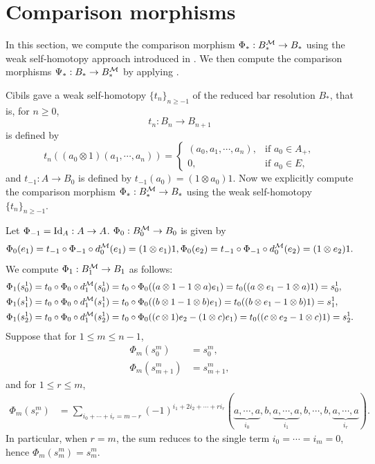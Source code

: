 \documentclass[10pt, reqno]{amsart}
\theoremstyle{definition}
\theoremstyle{remark}
\numberwithin{equation}{section}
\begin{document}
\section{Comparison morphisms}\label{sec: Comparison morphisms}
 In this section, we compute the comparison morphism $\Phi_*:B_*^{\mathcal{M}} \to B_*$ using  the weak self-homotopy approach introduced in \cite{IIVZ15}. We then compute the comparison morphisms $\Psi_*:B_* \to B_*^{\mathcal{M}}$ by applying \cite[Theorem 3.3]{CLZ24}.

Cibils\cite{Cib90} gave a weak self-homotopy \(\{t_n\}_{n\ge -1}\) of the reduced bar resolution \(B_*\), that is, for $n\geq0$,
\[t_n:B_n\to B_{n+1}\]
is defined by
\[
t_n((a_0\otimes 1)(a_1, \cdots, a_n)) =
\begin{cases}
    (a_0, a_1, \cdots , a_n), & \text{if } a_0 \in A_+, \\
    0, & \text{if } a_0 \in E,
\end{cases}
\]
and \(t_{-1}: A \to B_0\) is defined by $t_{-1}(a_0) =(1\otimes a_0)1$. Now we explicitly compute the comparison morphism \(\Phi_*:B_*^{\mathcal{M}} \to B_*\) using the weak self-homotopy \(\{t_n\}_{n\ge -1}\).

Let $\Phi_{-1}=\mathrm{Id}_A:A\rightarrow{A}$. $\Phi_0:B_0^{\mathcal{M}}\to B_0$ is given by
\[\Phi_0(e_1)=t_{-1}\circ\Phi_{-1}\circ d_0^{\mathcal{M}}(e_1)=(1 \otimes e_1)1, \Phi_0(e_2)=t_{-1}\circ\Phi_{-1}\circ d_0^{\mathcal{M}}(e_2)=(1 \otimes e_2)1.\]
We compute \(\Phi_1:B_1^{\mathcal{M}}\to B_1\) as follows:
\begin{equation*}
    \begin{aligned}
        \Phi_1(s_0^1) &= t_0\circ \Phi_0\circ d_1^{\mathcal{M}}(s_0^1) = t_0\circ\Phi_0((a\otimes1-1\otimes a)e_1) = t_0((a\otimes e_1-1\otimes a)1) = s_0^1, \\
        \Phi_1(s_1^1) &= t_0\circ\Phi_0\circ d_1^{\mathcal{M}}(s_1^1) = t_0\circ\Phi_0((b\otimes1-1\otimes b)e_1) = t_0((b\otimes e_1-1\otimes b)1)=s_1^1, \\
        \Phi_1(s_2^1) &= t_0\circ\Phi_0\circ d_1^{\mathcal{M}}(s_2^1) = t_0\circ\Phi_0((c\otimes1)e_2-(1\otimes c)e_1) = t_0((c\otimes e_2-1\otimes c)1)= s_2^1.
    \end{aligned}
\end{equation*}
Suppose that for $1\le m\le n-1$, 
\begin{equation*}
    \begin{aligned}
        \Phi_m(s_0^m) &=s_0^m, \\
        \Phi_m(s_{m+1}^m) &=s_{m+1}^m,
    \end{aligned}
\end{equation*}
and for $1\le r\le m$,
\begin{equation*}
    \begin{aligned}
        \Phi_m(s_r^m) &=\sum_{i_0+\cdots+i_r = m-r} (-1)^{i_1+2i_2+\cdots+ri_r}(\underbrace{a,\cdots,a}_{i_0},b,\underbrace{a,\cdots,a}_{i_1},b,\cdots,b,\underbrace{a,\cdots,a}_{i_r}).
    \end{aligned}
\end{equation*}
In particular, when $r=m$, the sum reduces to the single term $i_0=\cdots=i_m=0$, hence $\Phi_m(s_m^m) = s_m^m$.
\end{document}
